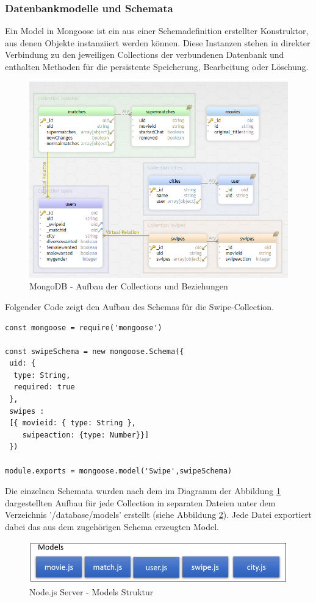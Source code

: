 \subsubsection{Datenbankmodelle und Schemata}
Ein Model in Mongoose ist ein aus einer Schemadefinition erstellter Konstruktor, aus denen Objekte instanziiert werden können. Diese Instanzen stehen in direkter Verbindung zu den jeweiligen Collections der verbundenen Datenbank und enthalten Methoden für die persistente Speicherung, Bearbeitung oder Löschung.

\begin{figure}[tbt]
\centering
\includegraphics[width=\textwidth]{images/databasemodells.PNG}
\caption{MongoDB - Aufbau der Collections und Beziehungen}
\label{fig:databasemodells}
\end{figure}

\noindent
Folgender Code zeigt den Aufbau des Schemas für die Swipe-Collection. \\

\begin{lstlisting}[caption=Swipe Schema und Model, label=lst:modelswipe]
const mongoose = require('mongoose')

const swipeSchema = new mongoose.Schema({
 uid: {
  type: String,
  required: true
 },
 swipes :
 [{ movieid: { type: String },
    swipeaction: {type: Number}}]
 })

module.exports = mongoose.model('Swipe',swipeSchema)
\end{lstlisting}

\noindent
Die einzelnen Schemata wurden nach dem im Diagramm der Abbildung \ref{fig:databasemodells} dargestellten Aufbau für jede Collection in separaten Dateien unter dem Verzeichnis '/database/models' erstellt (siehe Abbildung \ref{fig:node_structure}). Jede Datei exportiert dabei das aus dem zugehörigen Schema erzeugten Model.

\begin{figure}[tbt]
\centering
\includegraphics[width=12cm]{images/modelsstruktur.PNG}
\caption{Node.js Server - Models Struktur}
\label{fig:node_structure}
\end{figure}
